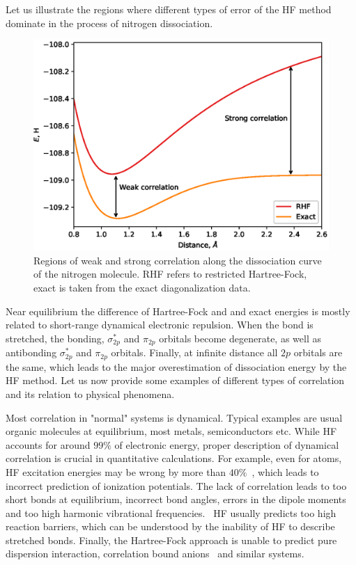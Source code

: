 Let us illustrate the regions where different types of error of the HF method 
dominate in the process of nitrogen dissociation. 
%
\begin{figure}[tb]
\includegraphics[width=\columnwidth]{figures/prelim/hf_exact}
\caption{Regions of weak and strong correlation along the dissociation 
curve of the nitrogen molecule. RHF refers to restricted Hartree-Fock, exact is 
taken from the exact diagonalization data.
\label{fig:n2_hf_exact}}
\end{figure}
%
Near equilibrium the difference of Hartree-Fock and and exact energies is 
mostly related to short-range dynamical electronic repulsion. When the 
bond is stretched, the bonding, $\sigma^{\ast}_{2p}$ and $\pi_{2p}$ 
orbitals become degenerate, as well as antibonding $\sigma^{\ast}_{2p}$ and 
$\pi_{2p}$ orbitals. Finally, at infinite distance all $2p$ orbitals are the 
same, which leads to the major overestimation of dissociation energy by the HF 
method. Let us now provide some examples of different types of correlation and 
its relation to physical phenomena.

Most correlation in "normal" systems is dynamical. Typical examples 
are usual organic molecules at equilibrium, most metals, semiconductors 
etc. While HF accounts for around $99\%$ of electronic energy, proper 
description of dynamical correlation is crucial in quantitative calculations.
For example, even for atoms, HF excitation energies may be wrong by 
more than $40\%$~\cite{wilson2013methods}, which leads to incorrect prediction 
of ionization potentials. The lack of correlation leads to too short bonds at 
equilibrium, incorrect bond angles, errors in the dipole moments and too high 
harmonic vibrational frequencies.~\cite{helgaker2014molecular, 
scott1996harmonic} HF usually predicts too high reaction barriers, which can be 
understood by the inability of HF to describe stretched bonds. Finally, the 
Hartree-Fock approach is unable to predict pure dispersion 
interaction, correlation bound anions~\cite{voora2013existence} and similar 
systems.

